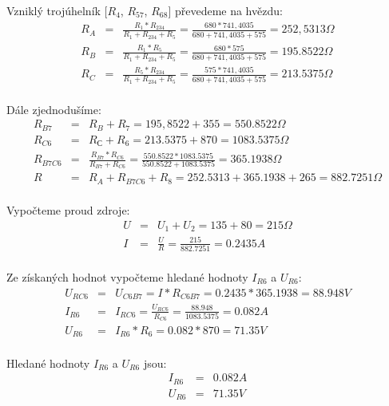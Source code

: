 \documentclass[a4paper,oneside,12pt]{article}
\begin{document}
	Vzniklý trojúhelník [$R_{4}$, $R_{57}$, $R_{68}$] převedeme na hvězdu:
	\begin{eqnarray*}
		R_{A} &= & \frac{R_{1} * R_{234}}{R_{1} + R_{234} + R_{5}} = \frac{680 * 741,4035}{680 + 741,4035 + 575} = 252,5313 \Omega\\
		R_{B} &= & \frac{R_{1} * R_{5}}{R_{1} + R_{234} + R_{5}} = \frac{680 * 575}{680 + 741,4035 + 575} = 195.8522 \Omega\\
		R_{C} &= & \frac{R_{5} * R_{234}}{R_{1} + R_{234} + R_{5}} = \frac{575 * 741,4035}{680 + 741,4035 + 575} = 213.5375 \Omega\\
	\end{eqnarray*}

	Dále zjednodušíme:
	\begin{eqnarray*}
		R_{B7} &= & R_{B} + R_{7} = 195,8522 + 355 = 550.8522 \Omega\\
		R_{C6} &= & R_{С} + R_{6} = 213.5375 + 870 = 1083.5375 \Omega\\
		R_{B7C6} &= & \frac{R_{B7} * R_{C6}}{R_{B7} + R_{C6}} = \frac{550.8522 * 1083.5375}{550.8522 + 1083.5375} = 365.1938 \Omega\\
		R &= & R_{A} + R_{B7C6} + R_{8} = 252.5313 + 365.1938 + 265 = 882.7251 \Omega\\
	\end{eqnarray*}

	Vypočteme proud zdroje:
	\begin{eqnarray*}
		U &= & U_{1} + U_{2} = 135 + 80 = 215 \Omega\\
		I &= & \frac{U}{R} = \frac{215}{882.7251} = 0.2435 A\\
	\end{eqnarray*}

	Ze získaných hodnot vypočteme hledané hodnoty $I_{R6}$ a $U_{R6}$:
	\begin{eqnarray*}
		U_{RC6} &= & U_{C6B7} = I * R_{C6B7} = 0.2435 * 365.1938 = 88.948 V\\
		I_{R6} &= & I_{RC6} = \frac{U_{RC6}}{R_{C6}} = \frac{88.948}{1083.5375} = 0.082 A\\
		U_{R6} &= & I_{R6} * R_{6} = 0.082 * 870 = 71.35 V\\
	\end{eqnarray*}

	Hledané hodnoty $I_{R6}$ a $U_{R6}$ jsou:
	\begin{eqnarray*}
		I_{R6} &= & 0.082 A\\
		U_{R6} &= & 71.35 V\\
	\end{eqnarray*}
\end{document}
